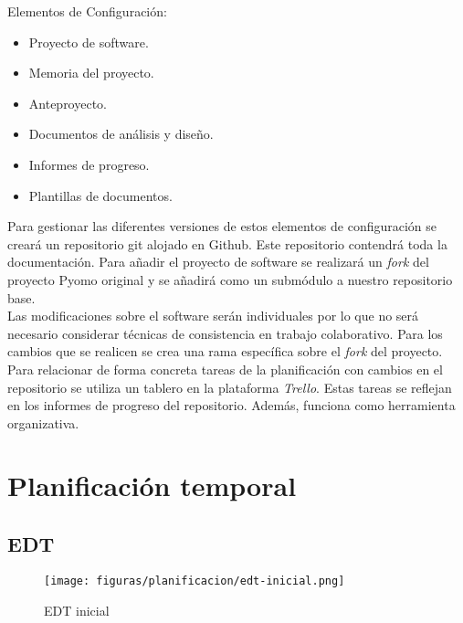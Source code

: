 Elementos de Configuración:
\begin{itemize}
    \item Proyecto de software.
    \item Memoria del proyecto.
    \item Anteproyecto.
    \item Documentos de análisis y diseño.
    \item Informes de progreso.
    \item Plantillas de documentos.
\end{itemize}

Para gestionar las diferentes versiones de estos elementos de configuración se creará un repositorio git alojado en Github. Este repositorio contendrá toda la documentación. Para añadir el proyecto de software se realizará un \textit{fork} del proyecto Pyomo original y se añadirá como un submódulo a nuestro repositorio base. \\

Las modificaciones sobre el software serán individuales por lo que no será necesario considerar técnicas de consistencia en trabajo colaborativo. Para los cambios que se realicen se crea una rama específica sobre el \textit{fork} del proyecto.\\

Para relacionar de forma concreta tareas de la planificación con cambios en el repositorio se utiliza un tablero en la plataforma \textit{Trello}. Estas tareas se reflejan en los informes de progreso del repositorio. Además, funciona como herramienta organizativa.

\section{Planificación temporal}

\subsection{EDT}

\begin{figure}[H]
    \centerline{\texttt{[image: figuras/planificacion/edt-inicial.png]}}
    \caption{EDT inicial}
\end{figure}


